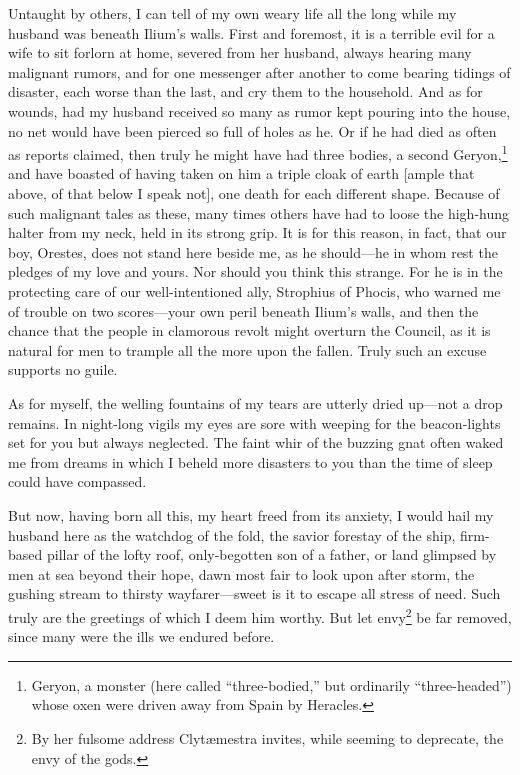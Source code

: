 \documentclass[12pt]{article}
\begin{document}
Untaught by others, I can tell of my own weary life all the long while my husband was beneath Ilium's walls. First and foremost, it is a terrible evil for a wife to sit forlorn at home, severed from her husband, always hearing many malignant rumors, and for one messenger after another to come bearing tidings of disaster, each worse than the last, and cry them to the household. And as for wounds, had my husband received so many as rumor kept pouring into the house, no net would have been pierced so full of holes as he. Or if he had died as often as reports claimed, then truly he might have had three bodies, a second Geryon,\footnote{Geryon, a monster (here called ``three-bodied,'' but ordinarily ``three-headed'') whose oxen were driven away from Spain by Heracles.} and have boasted of having taken on him a triple cloak of earth [ample that above, of that below I speak not], one death for each different shape. Because of such malignant tales as these, many times others have had to loose the high-hung halter from my neck, held in its strong grip. It is for this reason, in fact, that our boy, Orestes, does not stand here beside me, as he should---he in whom rest the pledges of my love and yours. Nor should you think this strange. For he is in the protecting care of our well-intentioned ally, Strophius of Phocis, who warned me of trouble on two scores---your own peril beneath Ilium's walls, and then the chance that the people in clamorous revolt might overturn the Council, as it is natural for men to trample all the more upon the fallen. Truly such an excuse supports no guile.

As for myself, the welling fountains of my tears are utterly dried up---not a drop remains. In night-long vigils my eyes are sore with weeping for the beacon-lights set for you but always neglected. The faint whir of the buzzing gnat often waked me from dreams in which I beheld more disasters to you than the time of sleep could have compassed.

But now, having born all this, my heart freed from its anxiety, I would hail my husband here as the watchdog of the fold, the savior forestay of the ship, firm-based pillar of the lofty roof, only-begotten son of a father, or land glimpsed by men at sea beyond their hope, dawn most fair to look upon after storm, the gushing stream to thirsty wayfarer---sweet is it to escape all stress of need. Such truly are the greetings of which I deem him worthy. But let envy\footnote{By her fulsome address Clyt{\ae}mestra invites, while seeming to deprecate, the envy of the gods.} be far removed, since many were the ills we endured before.
\end{document}
